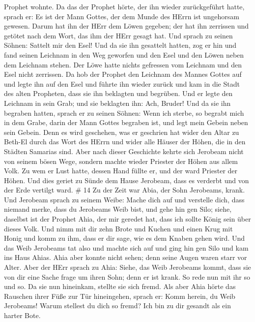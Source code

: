 Prophet wohnte.  Da das der Prophet hörte, der ihn wieder
zurückgeführt hatte, sprach er: Es ist der Mann Gottes, der dem Munde
des HErrn ist ungehorsam gewesen. Darum hat ihn der HErr dem Löwen
gegeben; der hat ihn zerrissen und getötet nach dem Wort, das ihm der
HErr gesagt hat.  Und sprach zu seinen Söhnen: Sattelt mir
den Esel! Und da sie ihn gesattelt hatten,  zog er hin und
fand seinen Leichnam in den Weg geworfen und den Esel und den Löwen
neben dem Leichnam stehen. Der Löwe hatte nichts gefressen vom Leichnam
und den Esel nicht zerrissen.  Da hob der Prophet den
Leichnam des Mannes Gottes auf und legte ihn auf den Esel und führte ihn
wieder zurück und kam in die Stadt des alten Propheten, dass sie ihn
beklagten und begrüben.  Und er legte den Leichnam in sein
Grab; und sie beklagten ihn: Ach, Bruder!  Und da sie ihn
begraben hatten, sprach er zu seinen Söhnen: Wenn ich sterbe, so begrabt
mich in dem Grabe, darin der Mann Gottes begraben ist, und legt mein
Gebein neben sein Gebein.  Denn es wird geschehen, was er
geschrien hat wider den Altar zu Beth-El durch das Wort des HErrn und
wider alle Häuser der Höhen, die in den Städten Samarias sind.
 Aber nach dieser Geschichte kehrte sich Jerobeam nicht von
seinem bösen Wege, sondern machte wieder Priester der Höhen aus allem
Volk. Zu wem er Lust hatte, dessen Hand füllte er, und der ward Priester
der Höhen.  Und dies geriet zu Sünde dem Hause Jerobeam,
dass es verderbt und von der Erde vertilgt ward. \# 14  Zu
der Zeit war Abia, der Sohn Jerobeams, krank.  Und Jerobeam
sprach zu seinem Weibe: Mache dich auf und verstelle dich, dass niemand
merke, dass du Jerobeams Weib bist, und gehe hin gen Silo; siehe,
daselbst ist der Prophet Ahia, der mir geredet hat, dass ich sollte
König sein über dieses Volk.  Und nimm mit dir zehn Brote
und Kuchen und einen Krug mit Honig und komm zu ihm, dass er dir sage,
wie es dem Knaben gehen wird.  Und das Weib Jerobeams tat
also und machte sich auf und ging hin gen Silo und kam ins Haus Ahias.
Ahia aber konnte nicht sehen; denn seine Augen waren starr vor Alter.
 Aber der HErr sprach zu Ahia: Siehe, das Weib Jerobeams
kommt, dass sie von dir eine Sache frage um ihren Sohn; denn er ist
krank. So rede nun mit ihr so und so. Da sie nun hineinkam, stellte sie
sich fremd.  Als aber Ahia hörte das Rauschen ihrer Füße zur
Tür hineingehen, sprach er: Komm herein, du Weib Jerobeams! Warum
stellest du dich so fremd? Ich bin zu dir gesandt als ein harter Bote.
